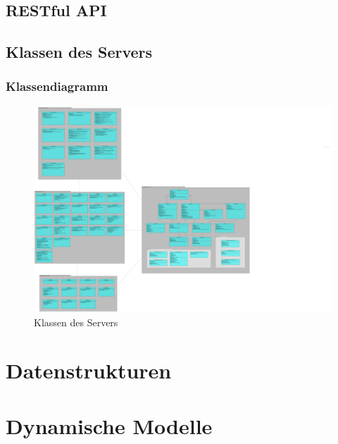 \documentclass[a4paper]{scrreprt}
\begin{document}
	\clearpage
	
	\clearpage
	
	\clearpage
	
	\clearpage
	\section{RESTful API}
	
	\clearpage
	\section{Klassen des Servers}
		\subsection{Klassendiagramm}
		\begin{figure}[H]
	       \centering
	       \includegraphics[scale = .05]{server-packages.png}
	       \caption{Klassen des Servers}
	      \end{figure}

	
 
 
\chapter{Datenstrukturen}
		

\chapter{Dynamische Modelle}
\end{document}

